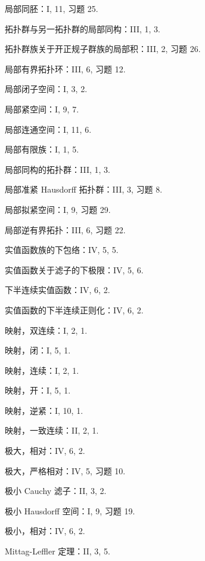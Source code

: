 局部同胚：I, 11, 习题 25.

拓扑群与另一拓扑群的局部同构：III, 1, 3.

拓扑群族关于开正规子群族的局部积：III, 2, 习题 26.

局部有界拓扑环：III, 6, 习题 12.

局部闭子空间：I, 3, 2.

局部紧空间：I, 9, 7.

局部连通空间：I, 11, 6.

局部有限族：I, 1, 5.

局部同构的拓扑群：III, 1, 3.

局部准紧 Hausdorff 拓扑群：III, 3, 习题 8.

局部拟紧空间：I, 9, 习题 29.

局部逆有界拓扑：III, 6, 习题 22.

实值函数族的下包络：IV, 5, 5.

实值函数关于滤子的下极限：IV, 5, 6.

下半连续实值函数：IV, 6, 2.

实值函数的下半连续正则化：IV, 6, 2.

映射，双连续：I, 2, 1.

映射，闭：I, 5, 1.

映射，连续：I, 2, 1.

映射，开：I, 5, 1.

映射，逆紧：I, 10, 1.

映射，一致连续：II, 2, 1.

极大，相对：IV, 6, 2.

极大，严格相对：IV, 5, 习题 10.

极小 Cauchy 滤子：II, 3, 2.

极小 Hausdorff 空间：I, 9, 习题 19.

极小，相对：IV, 6, 2.

Mittag-Leffler 定理：II, 3, 5.


